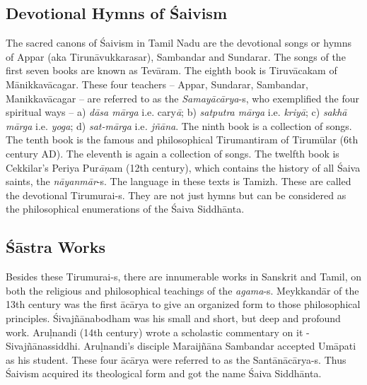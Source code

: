 \subsection{Devotional Hymns of Śaivism}

\vskip -4pt

The sacred canons of Śaivism in Tamil Nadu are the devotional songs or hymns of Appar (aka Tirunāvukkarasar), Sambandar and Sundarar. The songs of the first seven books are known as Tevāram. The eighth book is Tiruvācakam of Mānikkavācagar. These four teachers – Appar, Sundarar, Sambandar, Manikkavācagar -- are referred to as the \textit{Samayācārya}-s, who exemplified the four spiritual ways – a) \textit{dāsa mārga} i.e. cary\textit{ā}; b) \textit{satputra mārga} i.e. \textit{kriyā}; c) \textit{sakhā mārga} i.e. \textit{yoga}; d) \textit{sat-mārga} i.e\textit{. jñāna}. The ninth book is a collection of songs. The tenth book is the famous and philosophical Tirumantiram of Tirumūlar (6th century AD). The eleventh is again a collection of songs. The twelfth book is Cekkilar’s Periya Pur\textit{āṇ}am (12th century), which contains the history of all Śaiva saints, the \textit{nāyanmār}-s. The language in these texts is Tamizh. These are called the devotional Tirumurai-s. They are not just hymns but can be considered as the philosophical enumerations of the Śaiva Siddhānta.


\subsection{Śāstra Works}

\vskip -4pt

Besides these Tirumurai-s, there are innumerable works in Sanskrit and Tamil, on both the religious and philosophical teachings of the \textit{agama}-s. Meykkandār of the 13th century was the first ācārya to give an organized form to those philosophical principles. Śivajñānabodham was his small and short, but deep and profound work. Aruḷnandi (14th century) wrote a scholastic commentary on it - Sivajñānassiddhi. Aruḷnandi’s disciple Maraijñāna Sambandar accepted Umāpati as his student. These four ācārya were referred to as the Santānācārya-s. Thus Śaivism acquired its theological form and got the name Śaiva Siddhānta.


